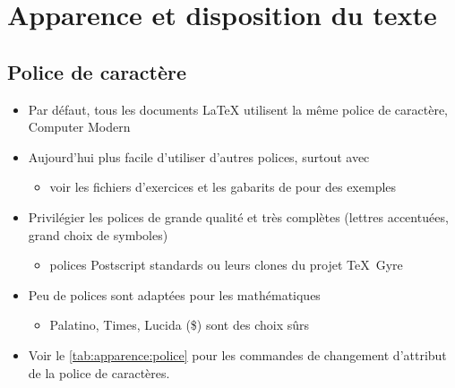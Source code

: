 \chapter{Apparence et disposition du texte}
\label{chap:apparence}



\section{Police de caractère}

\begin{itemize}
\item Par défaut, tous les documents {\LaTeX} utilisent la même police
  de caractère, {\selectfont Computer Modern}
\item Aujourd'hui plus facile d'utiliser d'autres polices, surtout
  avec {\XeLaTeX}
  \begin{itemize}
  \item voir les fichiers d'exercices et les gabarits de
     pour des exemples
  \end{itemize}
\item Privilégier les polices de grande qualité et très complètes
  (lettres accentuées, grand choix de symboles)
  \begin{itemize}
  \item polices Postscript standards ou leurs clones du projet
    TeX~Gyre
  \end{itemize}
\item Peu de polices sont adaptées pour les mathématiques
  \begin{itemize}
  \item {\selectfont Palatino},
    {\selectfont Times}, \textrm{Lucida} (\$) sont des
    choix sûrs
  \end{itemize}
\item Voir le \autoref{tab:apparence:police} pour les commandes de
  changement d'attribut de la police de caractères.
\end{itemize}

